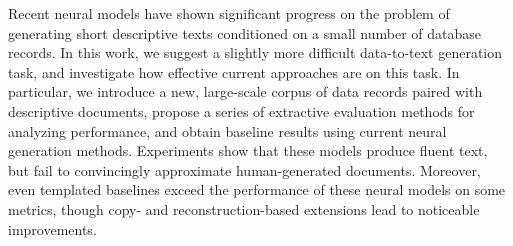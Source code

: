 Recent neural models have shown significant progress on the problem of generating short descriptive texts conditioned on a small number of database records. In this work, we suggest a slightly more difficult data-to-text generation task, and investigate how effective current approaches are on this task. In particular, we introduce a new, large-scale corpus of data records paired with descriptive documents, propose a series of extractive evaluation methods for analyzing performance, and obtain baseline results using current neural generation methods. Experiments show that these models produce fluent text, but fail to convincingly approximate human-generated documents. Moreover, even templated baselines exceed the performance of these neural models on some metrics, though copy- and reconstruction-based extensions lead to noticeable improvements.
